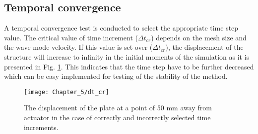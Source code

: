 \subsection{Temporal convergence}
A temporal convergence test is conducted to select the appropriate time step value.
The critical value of time increment (\(\Delta t_{cr}\)) depends on the mesh size and the wave mode velocity.
If this value is set over (\(\Delta t_{cr}\)), the displacement of the structure will increase to infinity in the initial moments of the simulation as it is presented in Fig. \ref{fig:dt_cr}.
This indicates that the time step have to be further decreased which can be easy implemented for testing of the stability of the method.
\begin{figure}[!tbh]
	\begin{center}
		\texttt{[image: Chapter\_5/dt\_cr]}
	\end{center}
	\caption{The displacement of the plate at a point of 50 mm away from actuator in the case of correctly and incorrectly selected time increments.}
	\label{fig:dt_cr}
\end{figure}
